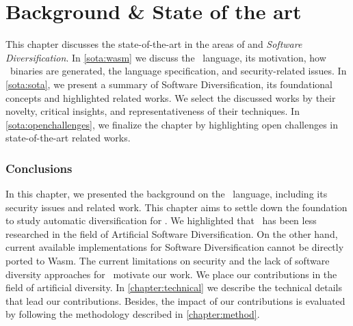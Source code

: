 \chapter{Background \& State of the art}
\label{chapter:sota}

This chapter discusses the state-of-the-art in the areas of \emph{\wasm} and \emph{Software Diversification}. In \autoref{sota:wasm} we discuss the \wasm\ language, its motivation, how \wasm\ binaries are generated, the language specification, and security-related issues. In \autoref{sota:sota}, we present a summary of Software Diversification, its foundational concepts and highlighted related works.  
We select the discussed works by their novelty, critical insights, and representativeness of their techniques. 
In \autoref{sota:openchallenges}, we finalize the chapter by highlighting open challenges in state-of-the-art related works.







\subsection*{Conclusions}
In this chapter, we presented the background on the \wasm\ language, including its security issues and related work.
This chapter aims to settle down the foundation to study automatic diversification for \wasm. 
We highlighted  that \wasm\ has been less researched in the field of Artificial Software Diversification. 
On the other hand, current available implementations for Software Diversification cannot be directly ported to Wasm. 
The current limitations on security and the lack of software diversity approaches for \wasm\ motivate our work.
We place our contributions in the field of artificial diversity. 
In \autoref{chapter:technical} we describe the technical details that lead our contributions. 
Besides, the impact of our contributions is evaluated by following the methodology described in \autoref{chapter:method}.
